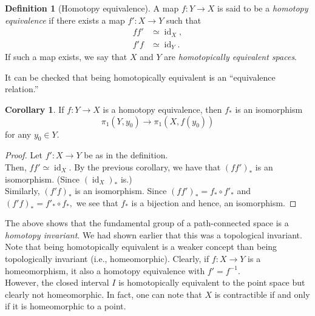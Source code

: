 \documentclass[12pt]{article}
\theoremstyle{definition}
\numberwithin{thm}{section}
\newtheorem{defn}[thm]{Definition}
\newtheorem{cor}[thm]{Corollary}
\newcommand{\id}{\operatorname{id}}
\begin{document}
\begin{defn}[Homotopy equivalence]
	A map $f:Y \to X$ is said to be a \emph{homotopy equivalence} if there exists a map $f':X \to Y$ such that
	\begin{align*} 
		ff' & \simeq \id_X,\\
		f'f & \simeq \id_Y.
	\end{align*}
	If such a map exists, we say that $X$ and $Y$ are \emph{homotopically equivalent spaces}.
\end{defn}
It can be checked that being homotopically equivalent is an ``equivalence relation.''

\begin{cor}
	If $f:Y \to X$ is a homotopy equivalence, then $f_*$ is an isomorphism
	\begin{equation*} 
		\pi_1(Y, y_0) \to \pi_1(X, f(y_0))
	\end{equation*}	
	for any $y_0 \in Y.$
\end{cor}
\begin{proof} 
	Let $f':X \to Y$ be as in the definition.\\
	Then, $ff' \simeq \id_X.$ By the previous corollary, we have that $(ff')_*$ is an isomorphism. (Since $(\id_X)_*$ is.)\\
	Similarly, $(f'f)_*$ is an isomorphism. Since $(ff')_* = f_*\circ f'_*$ and $(f'f)_* = f'_* \circ f_*,$ we see that $f_*$ is a bijection and hence, an isomorphism.
\end{proof}

The above shows that the fundamental group of a path-connected space is a \emph{homotopy invariant}. We had shown earlier that this was a topological invariant. \\
Note that being homotopically equivalent is a weaker concept than being topologically invariant (i.e., homeomorphic). Clearly, if $f:X \to Y$ is a homeomorphism, it also a homotopy equivalence with $f' = f^{-1}.$\\
However, the closed interval $I$ is homotopically equivalent to the point space but clearly not homeomorphic. In fact, one can note that $X$ is contractible if and only if it is homeomorphic to a point.
%
%
\end{document}
